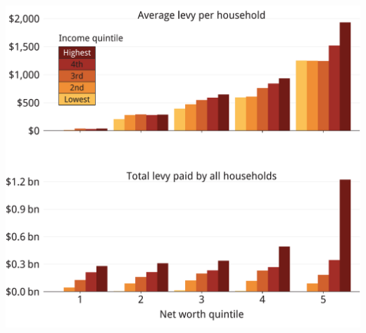 \documentclass[tikz]{standalone}\usepackage[]{graphicx}\usepackage[]{color}
\newenvironment{knitrout}{}{} %
\begin{document}
\begin{knitrout}
\color{fgcolor}
\includegraphics[width=11.000in,height=10in]{./Property-taxes/atlas/figure/PROP-Figure11-1} 

\end{knitrout}
\end{document}
